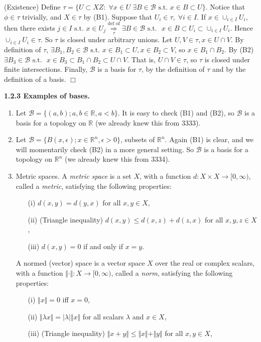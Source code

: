 \documentclass[12pt]{article}
\newcommand{\st}[0]{ \textrm{ s.t. } }
\newcommand{\rimply}[0] { \Rightarrow }
\newcommand{\reals}[0] { \mathbb{R}}
\newcommand{\eps}[0] {  \epsilon }
\newcommand{\B}[0] { \mathcal{B} }
\begin{document}
\begin{flushleft}
\begin{flushleft}
(Existence) Define $\tau = \{ U \subset X Z: \; \forall x \in U \; \exists B \in \B \st x \in B \subset U \}$.
Notice that  $\phi \in \tau$ trivially, and $X \in \tau$ by (B1). 
Suppose that $U_i \in \tau, \; \forall i \in I$.  If $x \in \cup_{i \in I} U_i$,
then there exists $j \in I \st x \in U_j  \underset{\tau}{\overset{\textrm{def of} }{\rimply}} \exists B \in \B \st$ $ x \in B \subset U_i \subset \cup_{i \in I} U_i$.  Hence  $\cup_{i \in I} U_i \in \tau$.
So $\tau$ is closed under arbitrary unions. Let $U, V \in \tau, x \in U \cap V$.
By definition of $\tau$, $\exists B_1, B_2 \in \B \st x \in B_1 \subset U, x \in B_2 \subset V$, so $x \in B_1 \cap B_2$.  By (B2) $\exists B_3 \in \B \st$ $ x \in B_3 \subset B_1 \cap B_2 \subset U \cap V$.
That is, $U \cap V \in \tau$, so $\tau$ is closed under finite intersections. 
Finally, $\B$ is a basis for $\tau$, by the definition of $\tau$ and by the definition of a basis. $\Box$\end{flushleft}\end{flushleft}\begin{flushleft} 
{ \bf 1.2.3  Examples of bases.  }\begin{enumerate}
\item
                Let $\B = \{ (a,b); a,b \in \reals, a<b \}$.  It is
easy to check (B1) and (B2), so $\B$ is a basis for a topology
on $\reals$ (we already knew this from 3333).
  \item
                Let $\B = \{ B(x, \eps); x \in \reals^n, \eps>0 \}$, subsets
of $\reals^n$.  Again (B1) is clear, and we will momentarily 
 check (B2) in a more general setting.  So $\B$ is a basis for a topology
on $\reals^n$  (we already knew this from 3334).    \item
                Metric spaces.  A {\em metric space} is a set $X$,
with a function $d : X \times X \rightarrow [0,\infty)$,
 called a {\em metric}, satisfying the following properties:
\begin{itemize}
\item [(i)]  $d(x,y) = d(y,x)$ for all $x, y \in X$,
\item [(ii)] (Triangle inequality) $d(x,y) \leq d(x,z) + d(z,x)$
 for all $x, y, z  \in X$,
\item [(iii)]  $d(x,y) = 0$ if and only if $x = y$.
\end{itemize}

A normed (vector) space is a vector space $X$ over the real or complex scalars,
with a
function
$\Vert \cdot \Vert : X \rightarrow [0,\infty)$,
called a {\em norm},  satisfying the following properties:
\begin{itemize}
\item [(i)]  $\Vert x \Vert = 0$ iff $x = 0$,
\item [(ii)] $ \Vert \lambda x \Vert = |\lambda | \Vert  x \Vert$ for
all scalars $\lambda$ and $x \in X$,
\item [(iii)]  (Triangle inequality) $\Vert x + y \Vert \leq \Vert x \Vert + \Vert y \Vert$
for all $x, y \in X$,
\end{itemize}


\end{enumerate}
\end{flushleft}
\end{document}
